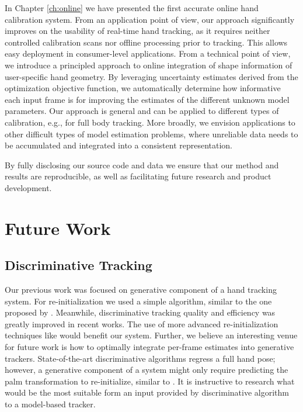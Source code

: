 In Chapter \ref{ch:online} we have presented the first accurate online hand calibration system. 
From an application point of view, our approach significantly improves on the usability of real-time hand tracking, as it requires neither controlled calibration scans nor offline processing prior to tracking. This allows easy deployment in consumer-level applications. From a technical point of view, we introduce a principled approach to online integration of shape information of user-specific hand geometry. By leveraging uncertainty estimates derived from the optimization objective function, we automatically determine how informative each input frame is for improving the estimates of the different unknown model parameters. Our approach is general and can be applied to different types of calibration, e.g., for full body tracking. More broadly, we envision applications to other difficult types of model estimation problems, where unreliable data needs to be accumulated and integrated into a consistent representation.

By fully disclosing our source code and data we ensure that our method and results are reproducible, as well as facilitating future research and product development. 

\section {Future Work}

\subsection*{Discriminative Tracking}
Our previous work was focused on generative component of a hand tracking system. For re-initialization we used a simple algorithm, similar to the one proposed by \cite{qian2014realtime}. Meanwhile, discriminative tracking quality and efficiency was greatly improved in recent works. 
The use of more advanced re-initialization techniques like \cite{oberweger2017deepprior++} would benefit our system. Further, we believe an interesting venue for future work is how to optimally integrate per-frame estimates into generative trackers. State-of-the-art discriminative algorithms regress a full hand pose; however, a generative component of a system might only require predicting the palm transformation to re-initialize, similar to \cite{taylor2017articulated}. It is instructive to research what would be the most suitable form an input provided by discriminative algorithm to a model-based tracker.

